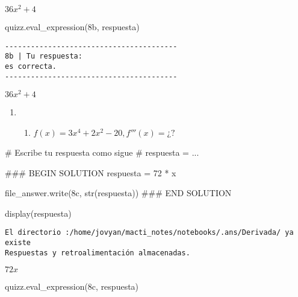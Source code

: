 \documentclass[
  letterpaper,
  DIV=11,
  numbers=noendperiod]{scrreprt}
\newenvironment{Shaded}{\begin{snugshade}}{\end{snugshade}}
\newcommand{\BuiltInTok}[1]{\textcolor[rgb]{0.00,0.23,0.31}{#1}}
\newcommand{\CommentTok}[1]{\textcolor[rgb]{0.37,0.37,0.37}{#1}}
\newcommand{\DecValTok}[1]{\textcolor[rgb]{0.68,0.00,0.00}{#1}}
\newcommand{\NormalTok}[1]{\textcolor[rgb]{0.00,0.23,0.31}{#1}}
\newcommand{\OperatorTok}[1]{\textcolor[rgb]{0.37,0.37,0.37}{#1}}
\newcommand{\RegionMarkerTok}[1]{\textcolor[rgb]{0.00,0.23,0.31}{#1}}
\newcommand{\StringTok}[1]{\textcolor[rgb]{0.13,0.47,0.30}{#1}}
\providecommand{\tightlist}{%
  \setlength{\itemsep}{0pt}\setlength{\parskip}{0pt}}\usepackage{longtable,booktabs,array}
\begin{document}
$\displaystyle 36 x^{2} + 4$

\begin{Shaded}
\begin{Highlighting}[]
\NormalTok{quizz.eval\_expression(}\StringTok{\textquotesingle{}8b\textquotesingle{}}\NormalTok{, respuesta)}
\end{Highlighting}
\end{Shaded}

\begin{verbatim}
----------------------------------------
8b | Tu respuesta:
es correcta.
----------------------------------------
\end{verbatim}

$\displaystyle 36 x^{2} + 4$

\begin{enumerate}
\def\labelenumi{\arabic{enumi}.}
\setcounter{enumi}{7}
\tightlist
\item
  \begin{enumerate}
  \def\labelenumii{\alph{enumii}.}
  \setcounter{enumii}{2}
  \tightlist
  \item
    \(f(x) = 3x^4 + 2x^2 - 20, f'''(x) = ¿?\)
  \end{enumerate}
\end{enumerate}

\begin{Shaded}
\begin{Highlighting}[]
\CommentTok{\# Escribe tu respuesta como sigue }
\CommentTok{\# respuesta = ...}

\CommentTok{\#\#\# }\RegionMarkerTok{BEGIN}\CommentTok{ SOLUTION}
\NormalTok{respuesta }\OperatorTok{=} \DecValTok{72} \OperatorTok{*}\NormalTok{ x}

\NormalTok{file\_answer.write(}\StringTok{\textquotesingle{}8c\textquotesingle{}}\NormalTok{, }\BuiltInTok{str}\NormalTok{(respuesta))}
\CommentTok{\#\#\# }\RegionMarkerTok{END}\CommentTok{ SOLUTION}

\NormalTok{display(respuesta)}
\end{Highlighting}
\end{Shaded}

\begin{verbatim}
El directorio :/home/jovyan/macti_notes/notebooks/.ans/Derivada/ ya existe
Respuestas y retroalimentación almacenadas.
\end{verbatim}

$\displaystyle 72 x$

\begin{Shaded}
\begin{Highlighting}[]
\NormalTok{quizz.eval\_expression(}\StringTok{\textquotesingle{}8c\textquotesingle{}}\NormalTok{, respuesta)}
\end{Highlighting}
\end{Shaded}
\end{document}
